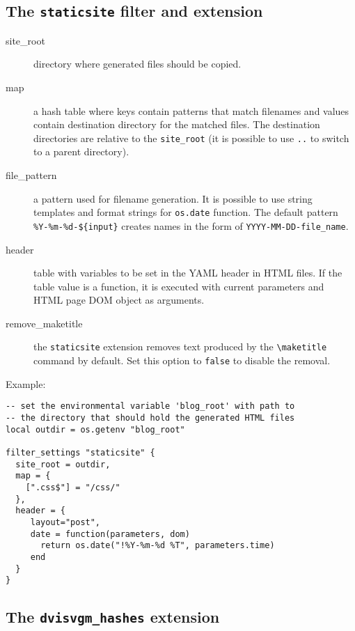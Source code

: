 \hypertarget{the-staticsite-filter-and-extension}{%
\subsection{\texorpdfstring{The \texttt{staticsite} filter and
extension}{The staticsite filter and extension}}\label{the-staticsite-filter-and-extension}}

\begin{description}
\item[site\_root]
directory where generated files should be copied.
\item[map]
a hash table where keys contain patterns that match filenames and values
contain destination directory for the matched files. The destination
directories are relative to the \texttt{site\_root} (it is possible to
use \texttt{..} to switch to a parent directory).
\item[file\_pattern]
a pattern used for filename generation. It is possible to use string
templates and format strings for \texttt{os.date} function. The default
pattern \texttt{\%Y-\%m-\%d-\$\{input\}} creates names in the form of
\texttt{YYYY-MM-DD-file\_name}.
\item[header]
table with variables to be set in the YAML header in HTML files. If the
table value is a function, it is executed with current parameters and
HTML page DOM object as arguments.
\item[remove\_maketitle]
the \texttt{staticsite} extension removes text produced by the
\texttt{\textbackslash{}maketitle} command by default. Set this option
to \texttt{false} to disable the removal.
\end{description}

Example:

\begin{verbatim}
-- set the environmental variable 'blog_root' with path to 
-- the directory that should hold the generated HTML files
local outdir = os.getenv "blog_root" 

filter_settings "staticsite" {
  site_root = outdir, 
  map = {
    [".css$"] = "/css/"
  },
  header = {
     layout="post",
     date = function(parameters, dom)
       return os.date("!%Y-%m-%d %T", parameters.time)
     end
  }
}
\end{verbatim}

\hypertarget{the-dvisvgm_hashes-extension}{%
\subsection{\texorpdfstring{The \texttt{dvisvgm\_hashes}
extension}{The dvisvgm\_hashes extension}}\label{the-dvisvgm_hashes-extension}}

